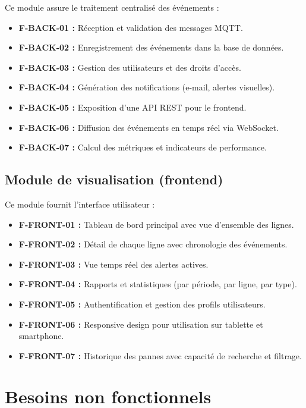 Ce module assure le traitement centralis\'e des \'ev\'enements :

\begin{itemize}
    \item \textbf{F-BACK-01 :} R\'eception et validation des messages MQTT.
    \item \textbf{F-BACK-02 :} Enregistrement des \'ev\'enements dans la base de donn\'ees.
    \item \textbf{F-BACK-03 :} Gestion des utilisateurs et des droits d'acc\`es.
    \item \textbf{F-BACK-04 :} G\'en\'eration des notifications (e-mail, alertes visuelles).
    \item \textbf{F-BACK-05 :} Exposition d'une API REST pour le frontend.
    \item \textbf{F-BACK-06 :} Diffusion des \'ev\'enements en temps r\'eel via WebSocket.
    \item \textbf{F-BACK-07 :} Calcul des m\'etriques et indicateurs de performance.
\end{itemize}

\subsection{Module de visualisation (frontend)}

Ce module fournit l'interface utilisateur :

\begin{itemize}
    \item \textbf{F-FRONT-01 :} Tableau de bord principal avec vue d'ensemble des lignes.
    \item \textbf{F-FRONT-02 :} D\'etail de chaque ligne avec chronologie des \'ev\'enements.
    \item \textbf{F-FRONT-03 :} Vue temps r\'eel des alertes actives.
    \item \textbf{F-FRONT-04 :} Rapports et statistiques (par p\'eriode, par ligne, par type).
    \item \textbf{F-FRONT-05 :} Authentification et gestion des profils utilisateurs.
    \item \textbf{F-FRONT-06 :} Responsive design pour utilisation sur tablette et smartphone.
    \item \textbf{F-FRONT-07 :} Historique des pannes avec capacit\'e de recherche et filtrage.
\end{itemize}

\section{Besoins non fonctionnels}

